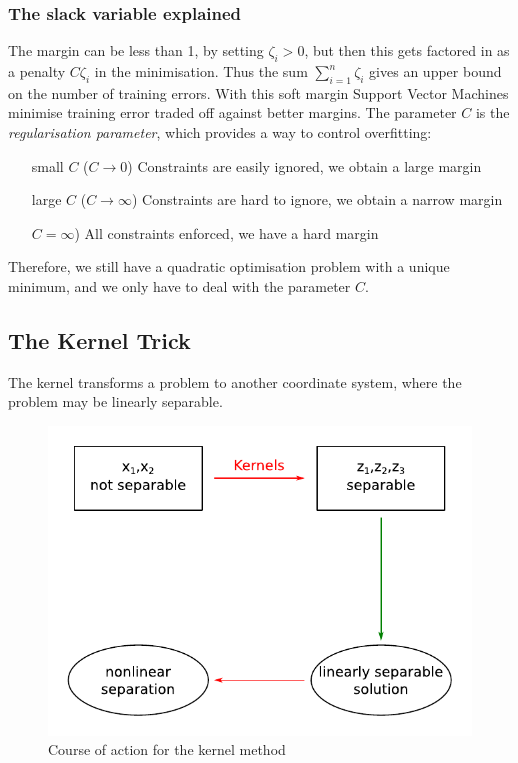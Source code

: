\documentclass[11pt]{article}
\begin{document}
\subsubsection{The slack variable explained}

The margin can be less than 1, by setting $\zeta_i > 0$, but then this gets factored in as a penalty $C\zeta_i$ in the minimisation. Thus the sum $\sum_{i=1}^{n}\zeta_i$ gives an upper bound on the number of training errors. With this soft margin Support Vector Machines minimise training error traded off against better margins. The parameter $C$ is the \textit{regularisation parameter}, which provides a way to control overfitting:

\begin{itemize}[leftmargin=*, labelindent=5cm, labelsep=0.5cm]
    \item[small $C$ ($C \rightarrow 0$)] Constraints are easily ignored, we obtain a large margin
    \item[large $C$ ($C \rightarrow \infty$)] Constraints are hard to ignore, we obtain a narrow margin
    \item[$C = \infty$)] All constraints enforced, we have a hard margin
\end{itemize}

Therefore, we still have a quadratic optimisation problem with a unique minimum, and we only have to deal with the parameter $C$.

\subsection{The Kernel Trick}

The kernel transforms a problem to another coordinate system, where the problem may be linearly separable.

\begin{figure}[htb!]
    \centering
    \includegraphics[keepaspectratio, width=0.5\linewidth]{Pictures/KernelTrick.pdf}
    \caption{Course of action for the kernel method}
    \label{fig:kerneltrick}
\end{figure}
\end{document}
